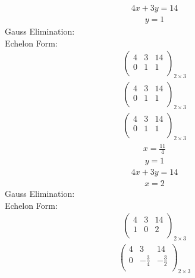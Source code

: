\documentclass{article}
\begin{document}
\begin{align*}
4x + 3y=14\end{align*}
\begin{align*}
y=1\end{align*}
Gauss Elimination:\\
Echelon Form:\\
\begin{align*}
\left(
\begin{array}{cc|c}
4 & 3 & 14\\
0 & 1 & 1\\
\end{array}
\right)_{2\times 3}
\end{align*}
\begin{align*}
\left(
\begin{array}{cc|c}
4 & 3 & 14\\
0 & 1 & 1\\
\end{array}
\right)_{2\times 3}
\end{align*}
\begin{align*}
\left(
\begin{array}{cc|c}
4 & 3 & 14\\
0 & 1 & 1\\
\end{array}
\right)_{2\times 3}
\end{align*}
\begin{align*}
x=\frac{11}{4}\end{align*}
\begin{align*}
y=1\end{align*}
\begin{align*}
4x + 3y=14\end{align*}
\begin{align*}
x=2\end{align*}
Gauss Elimination:\\
Echelon Form:\\
\begin{align*}
\left(
\begin{array}{cc|c}
4 & 3 & 14\\
1 & 0 & 2\\
\end{array}
\right)_{2\times 3}
\end{align*}
\begin{align*}
\left(
\begin{array}{cc|c}
4 & 3 & 14\\
0 & -\frac{3}{4} & -\frac{3}{2}\\
\end{array}
\right)_{2\times 3}
\end{align*}
\end{document}

